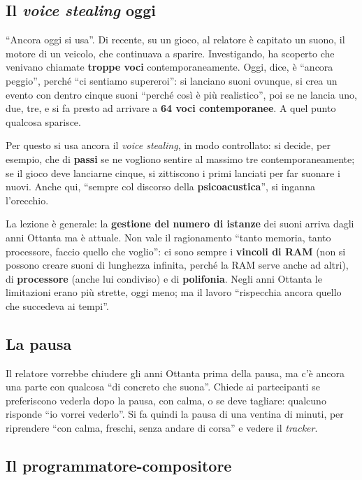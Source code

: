 \subsection{Il \emph{voice stealing} oggi}

``Ancora oggi si usa''. Di recente, su un gioco, al relatore è capitato un suono,
il motore di un veicolo, che continuava a sparire. Investigando, ha scoperto che
venivano chiamate \textbf{troppe voci} contemporaneamente. Oggi, dice, è
``ancora peggio'', perché ``ci sentiamo supereroi'': si lanciano suoni ovunque,
si crea un evento con dentro cinque suoni ``perché così è più realistico'', poi
se ne lancia uno, due, tre, e si fa presto ad arrivare a \textbf{64 voci
contemporanee}. A quel punto qualcosa sparisce.

Per questo si usa ancora il \emph{voice stealing}, in modo controllato: si decide,
per esempio, che di \textbf{passi} se ne vogliono sentire al massimo tre
contemporaneamente; se il gioco deve lanciarne cinque, si zittiscono i primi
lanciati per far suonare i nuovi. Anche qui, ``sempre col discorso della
\textbf{psicoacustica}'', si inganna l'orecchio.

La lezione è generale: la \textbf{gestione del numero di istanze} dei suoni
arriva dagli anni Ottanta ma è attuale. Non vale il ragionamento ``tanto memoria,
tanto processore, faccio quello che voglio'': ci sono sempre i \textbf{vincoli di
RAM} (non si possono creare suoni di lunghezza infinita, perché la RAM serve
anche ad altri), di \textbf{processore} (anche lui condiviso) e di
\textbf{polifonia}. Negli anni Ottanta le limitazioni erano più strette, oggi
meno; ma il lavoro ``rispecchia ancora quello che succedeva ai tempi''.

\subsection{La pausa}

Il relatore vorrebbe chiudere gli anni Ottanta prima della pausa, ma c'è ancora
una parte con qualcosa ``di concreto che suona''. Chiede ai partecipanti se
preferiscono vederla dopo la pausa, con calma, o se deve tagliare: qualcuno
risponde ``io vorrei vederlo''. Si fa quindi la pausa di una ventina di minuti,
per riprendere ``con calma, freschi, senza andare di corsa'' e vedere il
\emph{tracker}.

\subsection{Il programmatore-compositore}

